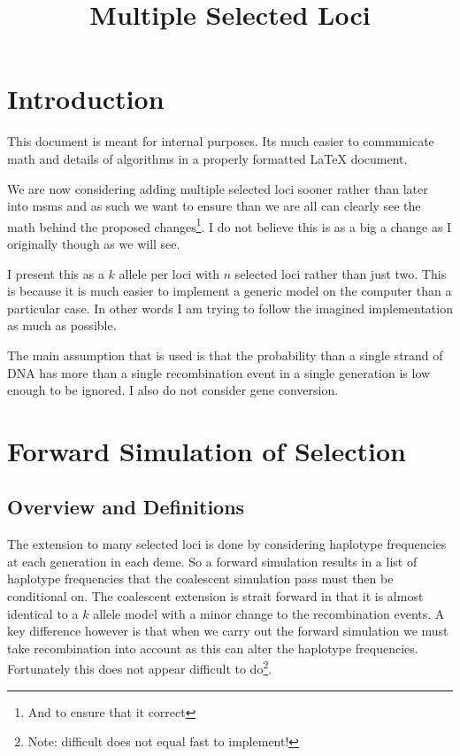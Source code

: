 \documentclass{article}
\begin{document}
\title{Multiple Selected Loci}
\maketitle

\section{Introduction} 
This document is meant   for internal purposes. Its much easier to
communicate math and details of algorithms in a properly formatted \LaTeX
document. 

We are now considering adding multiple selected loci sooner rather than later
into msms and as such we want to ensure than we are all can clearly see the
math behind the proposed changes\footnote{And to ensure that it correct}. I do
not believe this is as a big a change as I originally though as we will see. 

I present this as a $k$ allele per loci with $n$ selected loci rather than just
two. This is because it is much easier to implement a generic model on the
computer than a particular case. In other words I am trying to follow the
imagined implementation as much as possible. 

The main assumption that is used is that the probability than a single strand of
DNA has more than a single recombination event in a single generation is low
enough to be ignored. I also do not consider gene conversion. 

\section{Forward Simulation of Selection}

\subsection{Overview and Definitions}

\newcommand{\hap}{\mathbf{h}}
\newcommand{\happ}{\mathbf{h'}}

The extension to many selected loci is done by considering haplotype
frequencies at each generation in each deme. So a forward simulation results in a
list of haplotype frequencies that the coalescent simulation pass must then be
conditional on. The coalescent extension is strait forward in that it is almost
identical to a $k$ allele model with a minor change to the recombination events.
A key difference however is that when we carry out the forward simulation we must
take recombination into account as this can alter the haplotype frequencies.
Fortunately this does not appear difficult to do\footnote{Note: difficult does
not equal fast to implement!}.
\end{document}
